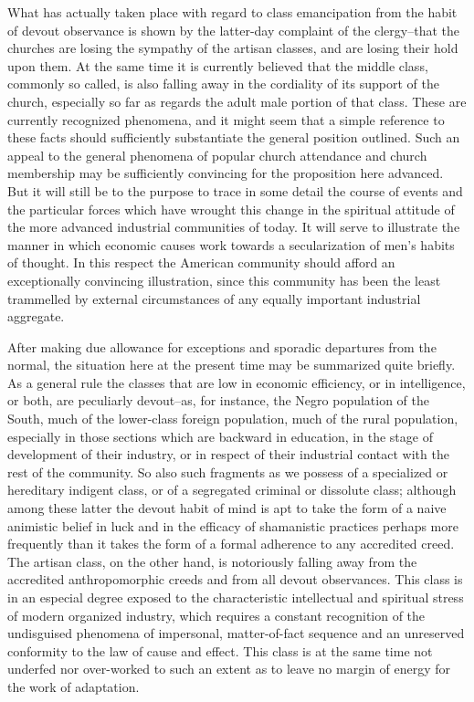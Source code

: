 \documentclass[12pt]{report}
\begin{document}
What has actually taken place with regard to class emancipation from the
habit of devout observance is shown by the latter-day complaint of
the clergy--that the churches are losing the sympathy of the artisan
classes, and are losing their hold upon them. At the same time it is
currently believed that the middle class, commonly so called, is also
falling away in the cordiality of its support of the church, especially
so far as regards the adult male portion of that class. These are
currently recognized phenomena, and it might seem that a simple
reference to these facts should sufficiently substantiate the general
position outlined. Such an appeal to the general phenomena of popular
church attendance and church membership may be sufficiently convincing
for the proposition here advanced. But it will still be to the purpose
to trace in some detail the course of events and the particular forces
which have wrought this change in the spiritual attitude of the more
advanced industrial communities of today. It will serve to illustrate
the manner in which economic causes work towards a secularization of
men's habits of thought. In this respect the American community should
afford an exceptionally convincing illustration, since this community
has been the least trammelled by external circumstances of any equally
important industrial aggregate.

After making due allowance for exceptions and sporadic departures from
the normal, the situation here at the present time may be summarized
quite briefly. As a general rule the classes that are low in economic
efficiency, or in intelligence, or both, are peculiarly devout--as, for
instance, the Negro population of the South, much of the lower-class
foreign population, much of the rural population, especially in those
sections which are backward in education, in the stage of development of
their industry, or in respect of their industrial contact with the rest
of the community. So also such fragments as we possess of a specialized
or hereditary indigent class, or of a segregated criminal or dissolute
class; although among these latter the devout habit of mind is apt to
take the form of a naive animistic belief in luck and in the efficacy of
shamanistic practices perhaps more frequently than it takes the form of
a formal adherence to any accredited creed. The artisan class, on
the other hand, is notoriously falling away from the accredited
anthropomorphic creeds and from all devout observances. This class is
in an especial degree exposed to the characteristic intellectual and
spiritual stress of modern organized industry, which requires a constant
recognition of the undisguised phenomena of impersonal, matter-of-fact
sequence and an unreserved conformity to the law of cause and effect.
This class is at the same time not underfed nor over-worked to such an
extent as to leave no margin of energy for the work of adaptation.
\end{document}

